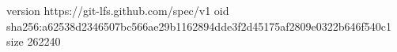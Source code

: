 version https://git-lfs.github.com/spec/v1
oid sha256:a62538d2346507bc566ae29b1162894dde3f2d45175af2809e0322b646f540c1
size 262240
